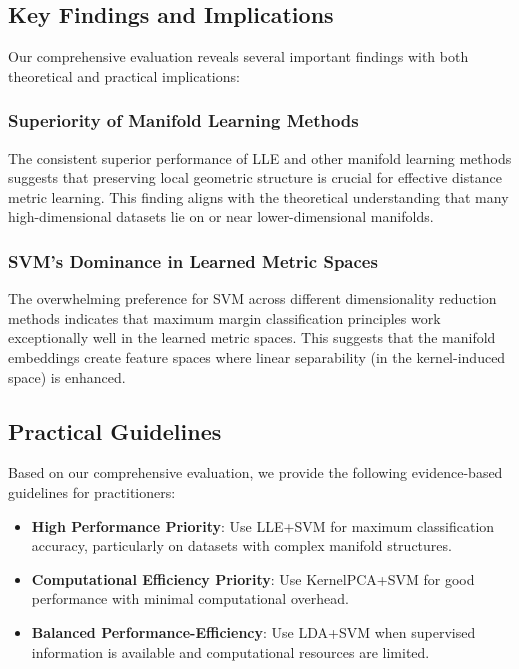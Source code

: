 \documentclass[review]{elsarticle}
\begin{document}
\subsection{Key Findings and Implications}

Our comprehensive evaluation reveals several important findings with both theoretical and practical implications:

\subsubsection{Superiority of Manifold Learning Methods}

The consistent superior performance of LLE and other manifold learning methods suggests that preserving local geometric structure is crucial for effective distance metric learning. This finding aligns with the theoretical understanding that many high-dimensional datasets lie on or near lower-dimensional manifolds.

\subsubsection{SVM's Dominance in Learned Metric Spaces}

The overwhelming preference for SVM across different dimensionality reduction methods indicates that maximum margin classification principles work exceptionally well in the learned metric spaces. This suggests that the manifold embeddings create feature spaces where linear separability (in the kernel-induced space) is enhanced.

\subsection{Practical Guidelines}

Based on our comprehensive evaluation, we provide the following evidence-based guidelines for practitioners:

\begin{itemize}
\item \textbf{High Performance Priority}: Use LLE+SVM for maximum classification accuracy, particularly on datasets with complex manifold structures.

\item \textbf{Computational Efficiency Priority}: Use KernelPCA+SVM for good performance with minimal computational overhead.

\item \textbf{Balanced Performance-Efficiency}: Use LDA+SVM when supervised information is available and computational resources are limited.
\end{itemize}
\end{document}
